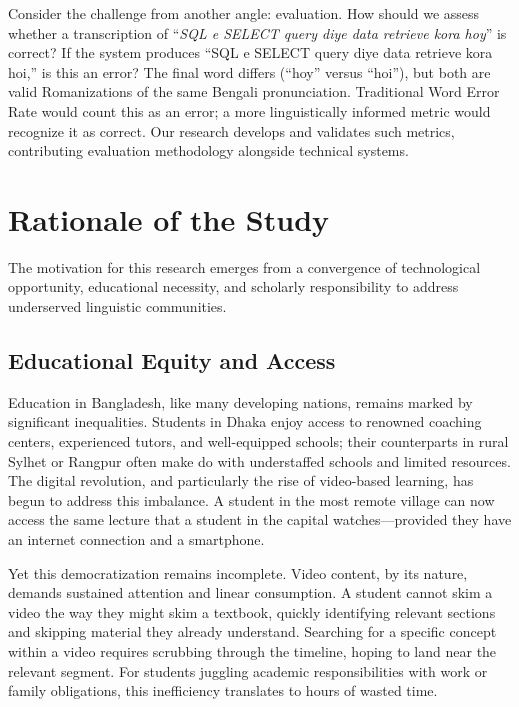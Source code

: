 Consider the challenge from another angle: evaluation. How should we assess whether a transcription of ``\textit{SQL e SELECT query diye data retrieve kora hoy}'' is correct? If the system produces ``SQL e SELECT query diye data retrieve kora hoi,'' is this an error? The final word differs (``hoy'' versus ``hoi''), but both are valid Romanizations of the same Bengali pronunciation. Traditional Word Error Rate would count this as an error; a more linguistically informed metric would recognize it as correct. Our research develops and validates such metrics, contributing evaluation methodology alongside technical systems.

\section{Rationale of the Study}

The motivation for this research emerges from a convergence of technological opportunity, educational necessity, and scholarly responsibility to address underserved linguistic communities.

\subsection{Educational Equity and Access}

Education in Bangladesh, like many developing nations, remains marked by significant inequalities. Students in Dhaka enjoy access to renowned coaching centers, experienced tutors, and well-equipped schools; their counterparts in rural Sylhet or Rangpur often make do with understaffed schools and limited resources. The digital revolution, and particularly the rise of video-based learning, has begun to address this imbalance. A student in the most remote village can now access the same lecture that a student in the capital watches---provided they have an internet connection and a smartphone.

Yet this democratization remains incomplete. Video content, by its nature, demands sustained attention and linear consumption. A student cannot skim a video the way they might skim a textbook, quickly identifying relevant sections and skipping material they already understand. Searching for a specific concept within a video requires scrubbing through the timeline, hoping to land near the relevant segment. For students juggling academic responsibilities with work or family obligations, this inefficiency translates to hours of wasted time.

